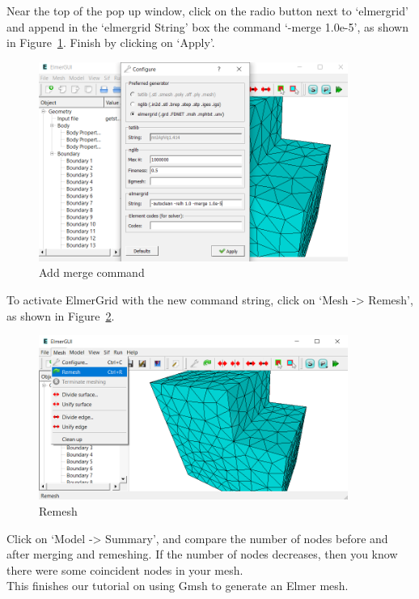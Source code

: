 Near the top of the pop up window, click on the radio button next to `elmergrid' and append in the `elmergrid String' box the command `-merge 1.0e-5', as shown in Figure~\ref{fg:gmsh-37}.  Finish by clicking on `Apply'.

\begin{figure}[H]
\centering
\includegraphics[width=0.9\textwidth]{gmsh-37}
\caption{Add merge command}\label{fg:gmsh-37}
\end{figure}

To activate ElmerGrid with the new command string, click on `Mesh -> Remesh', as shown in Figure~\ref{fg:gmsh-38}.

\begin{figure}[H]
\centering
\includegraphics[width=0.9\textwidth]{gmsh-38}
\caption{Remesh}\label{fg:gmsh-38}
\end{figure}

Click on `Model -> Summary', and compare the number of nodes before and after merging and remeshing.  If the number of nodes decreases, then you know there were some coincident nodes in your mesh.\\

This finishes our tutorial on using Gmsh to generate an Elmer mesh.

